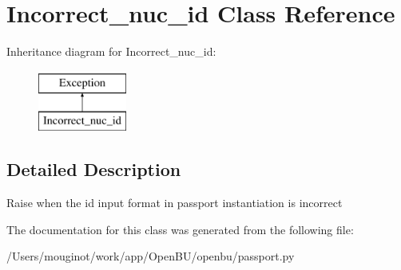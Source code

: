 \hypertarget{classopenbu_1_1passport_1_1_incorrect__nuc__id}{}\section{Incorrect\+\_\+nuc\+\_\+id Class Reference}
\label{classopenbu_1_1passport_1_1_incorrect__nuc__id}
Inheritance diagram for Incorrect\+\_\+nuc\+\_\+id\+:\begin{figure}[H]
\begin{center}
\leavevmode
\includegraphics[height=2.000000cm]{classopenbu_1_1passport_1_1_incorrect__nuc__id}
\end{center}
\end{figure}


\subsection{Detailed Description}
\begin{DoxyVerb}Raise when the id input format in passport instantiation is incorrect\end{DoxyVerb}
 

The documentation for this class was generated from the following file\+:\begin{DoxyCompactItemize}
\item 
/\+Users/mouginot/work/app/\+Open\+B\+U/openbu/passport.\+py\end{DoxyCompactItemize}
